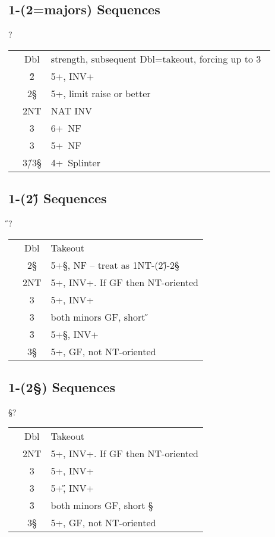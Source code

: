 \subsection{1\D-(2\D=majors) Sequences}

\begin{bidding}
\>\D{}\D\>?
\end{bidding}

\begin{longtable}{C{\linklength} C{\bidlength} l}
& Dbl & strength, subsequent Dbl=takeout, forcing up to 3\D\ \\
& 2\H & 5+\C, INV+ \\
& 2\S & 5+\D, limit raise or better \\
& 2NT & NAT INV \\
& 3\C & 6+\C\ NF \\
& 3\D & 5+\D\ NF \\
& 3\H/3\S & 4+\D\ Splinter \\  
\end{longtable}

\subsection{1\D-(2\H) Sequences}

\begin{bidding}
\>\D{}\H\>?
\end{bidding}

\begin{longtable}{C{\linklength} C{\bidlength} l}
& Dbl & Takeout \\
& 2\S & 5+\S, NF -- treat as 1NT-(2\H)-2\S\ \\
& 2NT & 5+\C, INV+. If GF then NT-oriented \\
& 3\C & 5+\D, INV+ \\
& 3\D & both minors GF, short \H \\
& 3\H & 5+\S, INV+ \\
& 3\S & 5+\C, GF, not NT-oriented \\
\end{longtable}

\subsection{1\D-(2\S) Sequences}

\begin{bidding}
\>\D{}\S\>?
\end{bidding}

\begin{longtable}{C{\linklength} C{\bidlength} l}
& Dbl & Takeout \\
& 2NT & 5+\C, INV+. If GF then NT-oriented \\
& 3\C & 5+\D, INV+ \\
& 3\D & 5+\H, INV+ \\
& 3\H & both minors GF, short \S \\
& 3\S & 5+\C, GF, not NT-oriented \\
\end{longtable}

